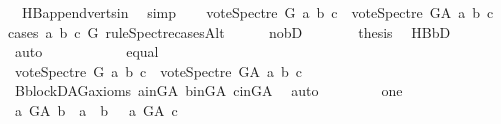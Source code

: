 \begin{isabellebody}
\ {}{\isacharparenleft}{\kern0pt}{}{\isacharparenright}{\kern0pt}\ HB{}{\isachardot}{\kern0pt}append{\isacharunderscore}{\kern0pt}verts{\isacharunderscore}{\kern0pt}in\ \isamarkupfalse%
\ simp\isanewline
\ \ \isamarkupfalse%
\ {\isachardoublequoteopen}vote{\isacharunderscore}{\kern0pt}Spectre\ G\ a\ b\ c\ {\isasymle}\ vote{\isacharunderscore}{\kern0pt}Spectre\ G{\isacharunderscore}{\kern0pt}A\ a\ b\ c{\isachardoublequoteclose}\isanewline
\ \ \isamarkupfalse%
{\isacharparenleft}{\kern0pt}cases\ a\ b\ c\ G\ rule{\isacharcolon}{\kern0pt}Spectre{\isacharunderscore}{\kern0pt}casesAlt{\isacharparenright}{\kern0pt}\isanewline
\ \ \ \ \isamarkupfalse%
\ no{\isacharunderscore}{\kern0pt}bD\isanewline
\ \ \ \ \isamarkupfalse%
\ \isamarkupfalse%
\ {\isacharquery}{\kern0pt}thesis\ \isamarkupfalse%
\ HB{}{\isachardot}{\kern0pt}bD\ {}{\isacharparenleft}{\kern0pt}{}{\isacharcomma}{\kern0pt}{}{\isacharcomma}{\kern0pt}{}{\isacharparenright}{\kern0pt}\ \isamarkupfalse%
\ auto\ \ \ \isanewline
\ \ \isamarkupfalse%
\isanewline
\ \ \ \ \isamarkupfalse%
\ equal\ \ \ \ \isanewline
\ \ \ \ \isamarkupfalse%
\ \isamarkupfalse%
\ {\isachardoublequoteopen}vote{\isacharunderscore}{\kern0pt}Spectre\ G\ a\ b\ c\ {\isasymle}\ vote{\isacharunderscore}{\kern0pt}Spectre\ G{\isacharunderscore}{\kern0pt}A\ a\ b\ c{\isachardoublequoteclose}\isanewline
\ \ \ \ \ \ \isamarkupfalse%
\ B{}{\isachardot}{\kern0pt}blockDAG{\isacharunderscore}{\kern0pt}axioms\ a{\isacharunderscore}{\kern0pt}in{\isacharunderscore}{\kern0pt}G{\isacharunderscore}{\kern0pt}A\ b{\isacharunderscore}{\kern0pt}in{\isacharunderscore}{\kern0pt}G{\isacharunderscore}{\kern0pt}A\ c{\isacharunderscore}{\kern0pt}in{\isacharunderscore}{\kern0pt}G{\isacharunderscore}{\kern0pt}A\ \isamarkupfalse%
\ auto\isanewline
\ \ \isamarkupfalse%
\isanewline
\ \ \ \ \isamarkupfalse%
\ one\isanewline
\ \ \ \ \isamarkupfalse%
\ \isamarkupfalse%
\ {\isachardoublequoteopen}{\isacharparenleft}{\kern0pt}a\ {\isasymrightarrow}\isactrlsup {\isacharplus}{\kern0pt}\isactrlbsub G{\isacharunderscore}{\kern0pt}A\isactrlesub \ b\ {\isasymor}\ a\ {\isacharequal}{\kern0pt}\ b{\isacharparenright}{\kern0pt}\ {\isasymand}\ {\isacharparenleft}{\kern0pt}{\isasymnot}\ a\ {\isasymrightarrow}\isactrlsup {\isacharplus}{\kern0pt}\isactrlbsub G{\isacharunderscore}{\kern0pt}A\isactrlesub \ c{\isacharparenright}{\kern0pt}{\isachardoublequoteclose}\ \isamarkupfalse%

\end{isabellebody}

